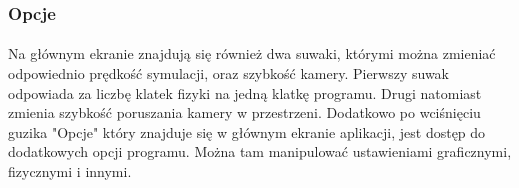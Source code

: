 \subsubsection{Opcje}\label{ssub:opcje}
\paragraph{}

Na głównym ekranie znajdują się również dwa suwaki, którymi można zmieniać odpowiednio prędkość symulacji, oraz szybkość kamery. Pierwszy suwak odpowiada za liczbę klatek fizyki na jedną klatkę programu. Drugi natomiast zmienia szybkość poruszania kamery w przestrzeni. Dodatkowo po wciśnięciu guzika "Opcje" który znajduje się w głównym ekranie aplikacji, jest dostęp do dodatkowych opcji programu. Można tam manipulować ustawieniami graficznymi, fizycznymi i innymi.

